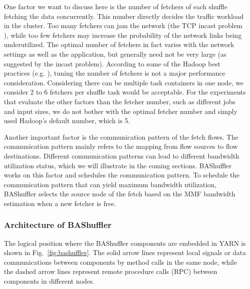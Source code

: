 \documentclass[10pt,journal,compsoc]{IEEEtran}
\begin{document}
One factor we want to discuss here is the number of fetchers of each shuffle fetching the data
concurrently.
This number directly decides the traffic workload in the cluster. Too many
fetchers can jam the network (the TCP incast problem \cite{Phanishayee:2008:MAT}),
while too few fetchers may increase the probability of the network
links being underutilized. 
The optimal number of fetchers in fact varies with the network settings as well as the application, but generally need not be very large (as suggested by the incast problem). 
According to some of the Hadoop best practices (e.g. \cite{white2015hadoop}), tuning the number of fetchers is not a major performance consideration. 
Considering there can be multiple task containers in one node, we consider 2 to 6 fetchers per shuffle task would be acceptable. 
For the experiments that evaluate the other factors than the fetcher number, such as different jobs and input sizes, we do not bother with the optimal fetcher number and simply used Hadoop's default number, which is 5. 

Another important factor is the communication pattern of the fetch
flows. 
The communication pattern mainly refers to the mapping from flow sources to flow destinations.
Different communication patterns can lead to different bandwidth utilization status, which we will illustrate in the coming sections.
BAShuffler works on this factor and schedules the communication pattern.
To schedule the communication pattern that can yield maximum bandwidth
utilization, BAShuffler selects the source node of the fetch based on the MMF bandwidth estimation
when a new fetcher is free.


\subsubsection{Architecture of BAShuffler}
The logical position where the BAShuffler components are embedded in YARN is shown in Fig.~\ref{fig:bashuffler}. 
The solid arrow lines represent local signals or data communications
between components by method calls in the same node,
while the dashed arrow lines represent remote procedure calls (RPC)
between components in different nodes.
\end{document}
